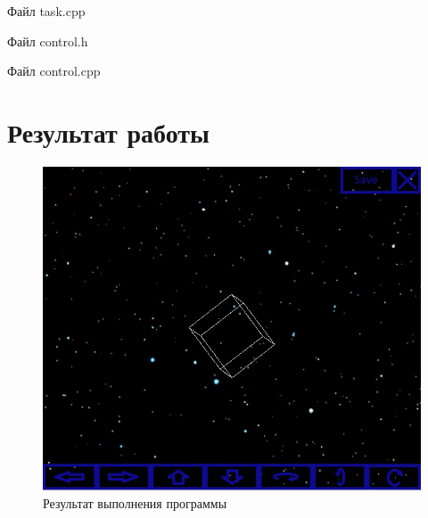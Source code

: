 \documentclass[14pt, a4paper]{extreport}
\begin{document}
\noindent Файл task.cpp

\hrulefill

\noindent Файл control.h

\hrulefill

\noindent Файл control.cpp


\chapter{Результат работы}

\begin{figure}[h!]
	\centering
	\includegraphics[width = 12cm]{image/output}
  \caption{Результат выполнения программы}
\end{figure}


\end{document}
